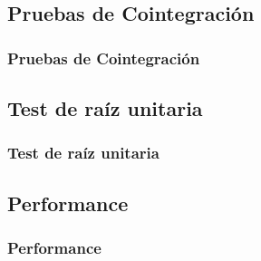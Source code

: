 \documentclass{beamer}
\begin{document}
        \subsection{Pruebas de Cointegración}
            \begin{frame}
            \frametitle{Pruebas de Cointegración}
            \end{frame}
        \subsection{Test de raíz unitaria}
            \begin{frame}
            \frametitle{Test de raíz unitaria}
            \end{frame}
        \subsection{Performance}
            \begin{frame}
            \frametitle{Performance}
            \end{frame}
\end{document}
